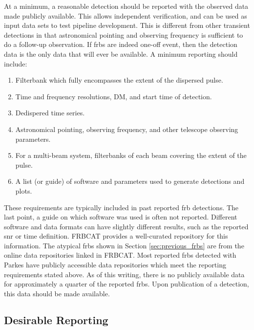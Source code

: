 \documentclass[a4paper,fleqn,usenatbib]{mnras}
\begin{document}
At a minimum, a reasonable detection should be reported with the observed data
made publicly available.  This allows independent verification, and can be used
as input data sets to test pipeline development.  This is different from other
transient detections in that astronomical pointing and observing frequency is
sufficient to do a follow-up observation. If \glspl{frb} are indeed one-off
event, then the detection data is the only data that will ever be available. A
minimum reporting should include:

\begin{enumerate}
    \item Filterbank which fully encompasses the extent of the dispersed pulse.
    \item Time and frequency resolutions, DM, and start time of detection.
    \item Dedispered time series.
    \item Astronomical pointing, observing frequency, and other telescope
    observing parameters.
    \item For a multi-beam system, filterbanks of each beam covering the extent
    of the pulse.
    \item A list (or guide) of software and parameters used to generate
    detections and plots.
\end{enumerate}

These requirements are typically included in past reported \gls{frb} detections.
The last point, a guide on which software was used is often not reported.
Different software and data formats can have slightly different results, such as
the reported \gls{snr} or time definition.  FRBCAT \citep{2016PASA...33...45P}
provides a well-curated repository for this information. The atypical
\glspl{frb} shown in Section \ref{sec:previous_frbs} are from the online data
repositories linked in FRBCAT. Most reported \glspl{frb} detected with Parkes
have publicly accessible data repositories which meet the reporting requirements
stated above. As of this writing, there is no publicly available data for
approximately a quarter of the reported \glspl{frb}. Upon publication of a
detection, this data should be made available.

\subsection{Desirable Reporting}
\end{document}
